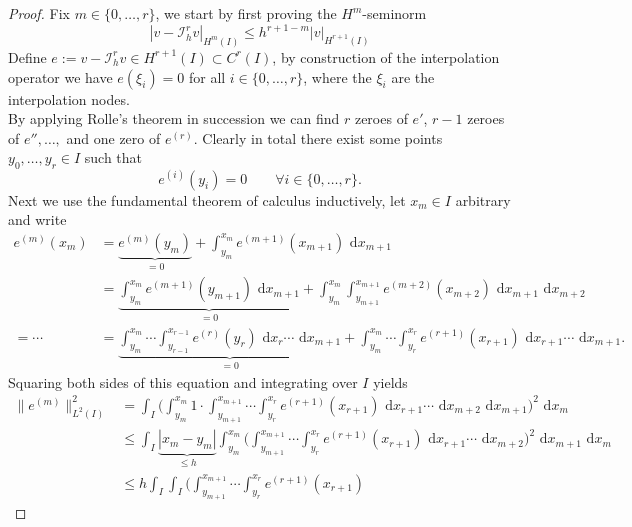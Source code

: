 \begin{proof}

		Fix $m \in \{0,\ldots,r\}$, we start by first proving the $H^m$-seminorm
		\begin{equation}
			\label{eq:proof_polynomial_interpolation_approx_estimate_seminorm}
			| v - \mathcal{I}_h^r v |_{H^m(I)} \leq h^{r+1-m} |v|_{H^{r+1}(I)}
		\end{equation} 
		Define $e := v - \mathcal{I}_h^r v \in H^{r+1}(I) \subset C^{r}(I)$, by construction of the interpolation operator we have $e(\xi_i) = 0$ for 
		all $i \in \{0,\ldots,r\}$, where the $\xi_i$ are the interpolation nodes. \\
		By applying Rolle's theorem in succession we can find $r$ zeroes of $e'$, $r-1$ zeroes of $e''$$,\ldots,$ and one zero of $e^{(r)}$.
		Clearly in total there exist some points $y_0,\ldots,y_{r} \in I$ such that 
		\begin{equation*}
			e^{(i)}(y_i) = 0 \qquad \forall i \in \{0,\ldots,r\}.
		\end{equation*} 
		Next we use the fundamental theorem of calculus inductively, let $x_m \in I$ arbitrary and write
		\begin{align*}
			e^{(m)}(x_m) &= \underbrace{e^{(m)}(y_m)}_{=0} + \int_{y_m}^{x_m} e^{(m+1)}(x_{m+1}) \text{ d}x_{m+1} \\
			&= \underbrace{\int_{y_m}^{x_m} e^{(m+1)}(y_{m+1}) \text{ d}x_{m+1}}_{=0} 
			+\int_{y_m}^{x_m} \int_{y_{m+1}}^{x_{m+1}} e^{(m+2)}(x_{m+2}) \text{ d}x_{m+1} \text{ d}x_{m+2} \\
			= \cdots &= \underbrace{\int_{y_m}^{x_m}\cdots \int_{y_{r-1}}^{x_{r-1}} e^{(r)}(y_{r}) \text{ d}x_{r} \cdots \text{ d}x_{m+1}}_{=0}
			+ \int_{y_m}^{x_m}\cdots \int_{y_{r}}^{x_{r}} e^{(r+1)}(x_{r+1}) \text{ d}x_{r+1} \cdots \text{ d}x_{m+1}.
		\end{align*}
		Squaring both sides of this equation and integrating over $I$ yields
		\begin{align*}
			\| e^{(m)} \|_{L^2(I)}^2 &= 
			\int_{I} \Big(\int_{y_m}^{x_m}1 \cdot \int_{y_{m+1}}^{x_{m+1}}\cdots \int_{y_{r}}^{x_{r}} e^{({r+1})}(x_{{r+1}}) 
			\text{ d}x_{{r+1}} \cdots \text{ d}x_{m+2} \text{ d}x_{m+1}\Big)^2 \text{ d}x_{m} \\
			& \leq \int_{I} \underbrace{|x_{m} - y_{m} |}_{\leq h} \int_{y_m}^{x_m} \Big(\int_{y_{m+1}}^{x_{m+1}}\cdots \int_{y_{r}}^{x_{r}} e^{({r+1})}(x_{{r+1}}) 
			\text{ d}x_{r+1} \cdots \text{ d}x_{m+2} \Big)^2 \text{ d}x_{m+1} \text{ d}x_{m} \\
			& \leq h \int_{I}  \int_{I} \Big(\int_{y_{m+1}}^{x_{m+1}}\cdots \int_{y_{r}}^{x_{r}} e^{(r+1)}(x_{r+1}) 

\end{align*}$$
\end{proof}
